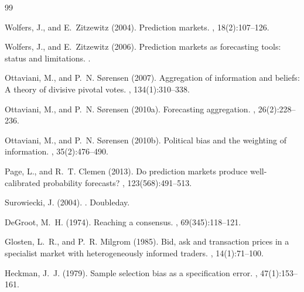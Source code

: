 \begin{thebibliography}{99}

Wolfers, J., and E.~Zitzewitz (2004).
\newblock Prediction markets.
, 18(2):107--126.

Wolfers, J., and E.~Zitzewitz (2006).
\newblock Prediction markets as forecasting tools: status and limitations.
.

Ottaviani, M., and P.~N. Sørensen (2007).
\newblock Aggregation of information and beliefs: A theory of divisive pivotal votes.
, 134(1):310--338.

Ottaviani, M., and P.~N. Sørensen (2010a).
\newblock Forecasting aggregation.
, 26(2):228--236.

Ottaviani, M., and P.~N. Sørensen (2010b).
\newblock Political bias and the weighting of information.
, 35(2):476--490.

Page, L., and R.~T. Clemen (2013).
\newblock Do prediction markets produce well-calibrated probability forecasts?
, 123(568):491--513.

Surowiecki, J. (2004).
.
\newblock Doubleday.

DeGroot, M.~H. (1974).
\newblock Reaching a consensus.
, 69(345):118--121.

Glosten, L.~R., and P.~R. Milgrom (1985).
\newblock Bid, ask and transaction prices in a specialist market with heterogeneously informed traders.
, 14(1):71--100.

Heckman, J.~J. (1979).
\newblock Sample selection bias as a specification error.
, 47(1):153--161.

\end{thebibliography}
